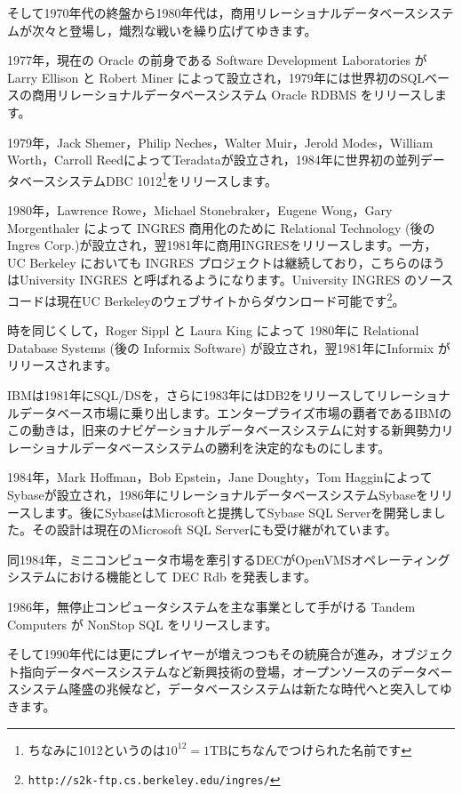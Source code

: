 そして1970年代の終盤から1980年代は，商用リレーショナルデータベースシステムが次々と登場し，熾烈な戦いを繰り広げてゆきます。


1977年，現在の Oracle の前身である Software Development Laboratories がLarry Ellison と Robert Miner によって設立され，1979年には世界初のSQLベースの商用リレーショナルデータベースシステム Oracle RDBMS をリリースします。


1979年，Jack Shemer，Philip Neches，Walter Muir，Jerold Modes，William Worth，Carroll ReedによってTeradataが設立され，1984年に世界初の並列データベースシステムDBC 1012\footnote{ちなみに1012というのは$10^{12} = 1 \mathrm{TB}$にちなんでつけられた名前です}をリリースします。


1980年，Lawrence Rowe，Michael Stonebraker，Eugene Wong，Gary Morgenthaler によって INGRES 商用化のために Relational Technology (後のIngres Corp.)が設立され，翌1981年に商用INGRESをリリースします。一方，UC Berkeley においても INGRES プロジェクトは継続しており，こちらのほうはUniversity INGRES と呼ばれるようになります。University INGRES のソースコードは現在UC Berkeleyのウェブサイトからダウンロード可能です\footnote{\verb|http://s2k-ftp.cs.berkeley.edu/ingres/|}。


時を同じくして，Roger Sippl と Laura King によって 1980年に Relational Database Systems (後の Informix Software) が設立され，翌1981年にInformix がリリースされます。


IBMは1981年にSQL/DSを，さらに1983年にはDB2をリリースしてリレーショナルデータベース市場に乗り出します。エンタープライズ市場の覇者であるIBMのこの動きは，旧来のナビゲーショナルデータベースシステムに対する新興勢力リレーショナルデータベースシステムの勝利を決定的なものにします。


1984年，Mark Hoffman，Bob Epstein，Jane Doughty，Tom HagginによってSybaseが設立され，1986年にリレーショナルデータベースシステムSybaseをリリースします。後にSybaseはMicrosoftと提携してSybase SQL Serverを開発しました。その設計は現在のMicrosoft SQL Serverにも受け継がれています。


同1984年，ミニコンピュータ市場を牽引するDECがOpenVMSオペレーティングシステムにおける機能として DEC Rdb を発表します。


1986年，無停止コンピュータシステムを主な事業として手がける Tandem Computers が NonStop SQL をリリースします。


そして1990年代には更にプレイヤーが増えつつもその統廃合が進み，オブジェクト指向データベースシステムなど新興技術の登場，オープンソースのデータベースシステム隆盛の兆候など，データベースシステムは新たな時代へと突入してゆきます。


